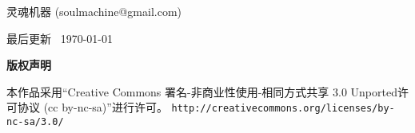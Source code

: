 \thispagestyle{plain}
\begin{center}
  {\LARGE\textbf{\BookTitle}}

  \vspace{1em}
  {\large 灵魂机器 (soulmachine@gmail.com)}

  \vspace{1ex}
  
  \vspace{1ex}
  最后更新 \thistime\, \today
  
  \vspace{1em}
  \textbf{\large 版权声明}
\end{center}
\noindent 本作品采用“Creative Commons 署名-非商业性使用-相同方式共享 3.0 Unported许可协议 
(cc by-nc-sa)”进行许可。
\texttt{\small http://creativecommons.org/licenses/by-nc-sa/3.0/}

\vspace{1em}
